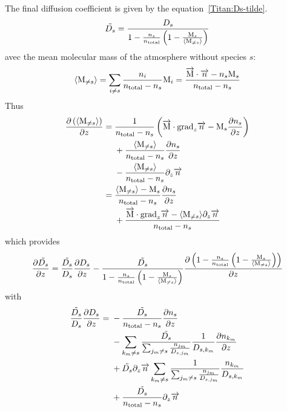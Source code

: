 The final diffusion coefficient is given by the equation~\ref{Titan:Ds-tilde}.
\begin{equation}
\tilde{D_s} = \frac{D_s}{1-\frac{n_s}{n_\text{total}}\left(1 - \frac{\text{M}_s}{\langle\text{M}_{\neq s}\rangle}\right)}
\label{Titan:Ds-tilde}
\end{equation}
avec  the mean molecular mass of the atmosphere without
species $s$:
\begin{equation}
\langle\text{M}_{\neq s}\rangle   = \sum_{i\neq s} \frac{n_i}{n_\text{total} - n_s}\text{M}_i
                      = \frac{\overrightarrow{\text{M}}\cdot\overrightarrow{n} - n_s\text{M}_s}{n_\text{total} - n_s}
\end{equation}
Thus
\begin{equation}
\begin{split}
\frac{\partial\left(\langle\text{M}_{\neq s}\rangle\right)}{\partial z} = 
        &\;   \frac{1}{n_\text{total} - n_s}\left( \overrightarrow{\text{M}}\cdot\text{grad}_{z}\overrightarrow{n} - \text{M}_s\frac{\partial n_s}{\partial z}\right) \\
        &\;  + \frac{\langle\text{M}_{\neq s}\rangle}{n_\text{total} - n_s} \frac{\partial n_s}{\partial z} \\
        &\;  - \frac{\langle\text{M}_{\neq s}\rangle}{n_\text{total} - n_s} \partial_{z}{\overrightarrow{n}} \\
=       &\;    \frac{\langle\text{M}_{\neq s}\rangle - \text{M}_s}{n_\text{total} - n_s} \frac{\partial n_s}{\partial z} \\
        &\;  + \frac{\overrightarrow{\text{M}}\cdot\text{grad}_{z}\overrightarrow{n} - \langle\text{M}_{\neq s}\rangle \partial_{z}{\overrightarrow{n}}}{n_\text{total} - n_s}
\end{split}
\end{equation}
which provides
\begin{equation}
\frac{\partial\tilde{D_s}}{\partial z}  = \frac{\tilde{D_s}}{D_s}\frac{\partial D_s}{\partial z}
                             - \frac{\tilde{D_s}}{1-\frac{n_s}{n_\text{total}}\left(1 - \frac{\text{M}_s}{\langle\text{M}_{\neq s}\rangle}\right)}
                                \frac{\partial\left(1-\frac{n_s}{n_\text{total}}\left(1 - \frac{\text{M}_s}{\langle\text{M}_{\neq s}\rangle}\right)\right)}{\partial z}
\end{equation}
with
\begin{equation}
\begin{split}
\frac{\tilde{D_s}}{D_s}\frac{\partial D_s}{\partial z}
                  = &\; - \frac{\tilde{D_s}}{n_\text{total} - n_s}\frac{\partial n_s}{\partial z} \\
                    &\; - \sum_{k_m\neq s}\frac{\tilde{D_s}}{\sum_{j_m \neq s}\frac{n_{j_m}}{D_{s,j_m}}}
                                \frac{1}{D_{s,k_m}} \frac{\partial n_{k_m}}{\partial z} \\
                    &\; +  \tilde{D_s}\partial_{z}{\overrightarrow{n}} \sum_{k_m\neq s}
                           \frac{1}{\sum_{j_m \neq s}\frac{n_{j_m}}{D_{s,j_m}}}
                                    \frac{n_{k_m}}{D_{s,k_m}} \\
                    &\; + \frac{\tilde{D_s}}{n_\text{total} - n_s}\partial_{z}{\overrightarrow{n}} \\
\end{split}
\end{equation}
